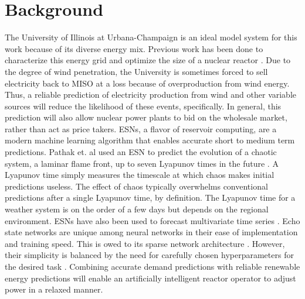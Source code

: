 \section{Background}
The University of Illinois at Urbana-Champaign is an ideal model system for
this work because of its diverse energy mix. Previous work has been done to
characterize this energy grid and optimize the size of a nuclear reactor \cite{dotson_optimal_2020}. Due to the degree of wind penetration, the University is sometimes
forced to sell electricity back to MISO at a loss because of overproduction
from wind energy. Thus, a reliable prediction of electricity production from
wind and other variable sources will reduce the likelihood of these events,
specifically. In general, this prediction will also allow nuclear power plants
to bid on the wholesale market, rather than act as price takers.
\acrshort{ESN}s, a flavor of reservoir computing, are a modern
machine learning algorithm that enables accurate short
to medium term predictions. Pathak et. al used an \acrshort{ESN} to predict the
evolution of a chaotic system, a laminar flame front, up to seven Lyapunov
times in the future \cite{pathak_model-free_2018, wikner_combining_2020}. A
Lyapunov time simply measures the timescale at which chaos makes initial
predictions useless. The effect of chaos typically overwhelms conventional
predictions after a single Lyapunov time, by definition.
The Lyapunov time for a weather system is on the order of a few days but
depends on the regional environment. \acrshort{ESN}s have also been used to
forecast multivariate time series
\cite{bianchi_reservoir_2020}. Echo state networks are unique among neural
networks in their ease of implementation and training speed. This is owed to its
sparse network architecture \cite{pathak_model-free_2018,
wikner_combining_2020, vannitsem_predictability_2017}. However,
their simplicity is balanced by the need for carefully chosen hyperparameters
for the desired task \cite{lukosevicius_practical_2012}.
Combining accurate demand predictions with reliable
renewable energy predictions will enable an artificially intelligent reactor
operator to adjust power in a relaxed manner.
